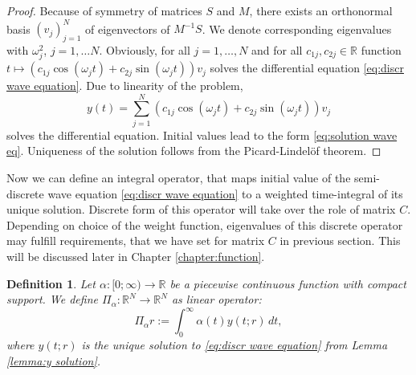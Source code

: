 \documentclass[a4paper,11pt,bibliography=totoc,listof=totoc,headinclude=true,cleardoublepage=empty,oneside]{scrbook}
\newtheorem{definition}[theorem]{Definition}
\newcommand{\R}{\mathbb{R}}
\begin{document}
\begin{proof}
    Because of symmetry of matrices $S$ and $M$, there exists an orthonormal basis $(v_j)_{j=1}^N$ of eigenvectors of $M^{-1}S$. We denote corresponding eigenvalues with $\omega_j^2$, $j=1, \dots N$. Obviously, for all $j=1, \dots, N$ and for all $c_{1j}, c_{2j}\in \R$ function $t\mapsto \left(c_{1j} \cos(\omega_j t) + c_{2j} \sin(\omega_j t)\right)v_j$ solves the differential equation \eqref{eq:discr wave equation}. Due to linearity of the problem, 
    \begin{equation*}
        y(t) = \sum_{j=1}^N \left(c_{1j} \cos(\omega_j t) + c_{2j} \sin(\omega_j t)\right)v_j
    \end{equation*}
    solves the differential equation. Initial values lead to the form \eqref{eq:solution wave eq}. Uniqueness of the solution follows from the Picard-Lindelöf theorem.
\end{proof}

Now we can define an integral operator, that maps initial value of the semi-discrete wave equation \eqref{eq:discr wave equation} to a weighted time-integral of its unique solution. Discrete form of this operator will take over the role of matrix $C$. Depending on choice of the weight function, eigenvalues of this discrete operator may fulfill requirements, that we have set for matrix $C$ in previous section. This will be discussed later in Chapter \ref{chapter:function}. 

\begin{definition}\label{def:pi_alpha}
    Let $\alpha: [0; \infty) \rightarrow \R$ be a piecewise continuous function with compact support. We define $\Pi_\alpha: \R^N \rightarrow \R^N$ as linear operator:
    \begin{equation*}
        \Pi_\alpha r := \int_0^\infty \alpha(t) y(t;r) \,dt,
    \end{equation*}
    where $y(t;r)$ is the unique solution to \eqref{eq:discr wave equation} from Lemma \ref{lemma:y solution}.
\end{definition}
\end{document}
